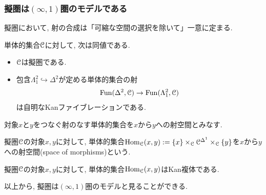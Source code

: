 \documentclass[aspectratio=169, dvipdfmx, 8pt, notheorems, uplatex]{beamer}
\begin{document}
\begin{frame}
  \frametitle{擬圏は$(\infty,1)$圏のモデルである}

  擬圏において, 射の合成は「可縮な空間の選択を除いて」一意に定まる. 

  \begin{theorem}[Joyal]
    単体的集合$\mathcal{C}$に対して, 次は同値である. 
    \begin{itemize}
      \item $\mathcal{C}$は擬圏である. 
      \item 包含$\Lambda^2_1 \hookrightarrow \Delta^2$が定める単体的集合の射
      \begin{align*}
        \mathrm{Fun}(\Delta^2,\mathcal{C}) \to \mathrm{Fun}(\Lambda^2_1, \mathcal{C})
      \end{align*}
      は自明なKanファイブレーションである.
    \end{itemize}
  \end{theorem}

  対象$x$と$y$をつなぐ射のなす単体的集合を$x$から$y$への射空間とみなす. 

  \begin{definition}[射空間]
    擬圏$\mathcal{C}$の対象$x,y$に対して, 単体的集合$\mathrm{Hom}_{\mathcal{C}}(x,y) := \{x\} \times_{\mathcal{C}} \mathcal{C}^{\Delta^1} \times_{\mathcal{C}} \{y\}$を$x$から$y$への射空間(space of morphisms)という. 
  \end{definition}

  \begin{theorem}
    擬圏$\mathcal{C}$の対象$x,y$に対して, 単体的集合$\mathrm{Hom}_{\mathcal{C}}(x,y)$はKan複体である. 
  \end{theorem}

  以上から, 擬圏は$(\infty,1)$圏のモデルと見ることができる. 

  


\end{frame}

\end{document}

